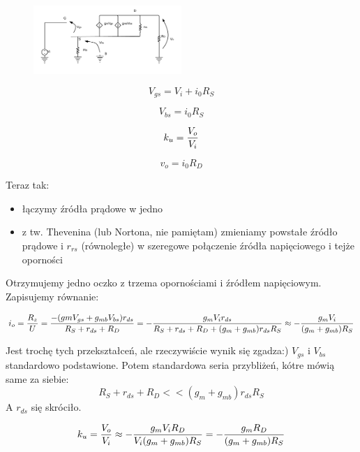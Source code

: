 \documentclass[10pt,a4paper]{article}
\begin{document}
\begin{figure}[H]
\centering
\includegraphics[width=0.5\textwidth]{DS}
\end{figure}

\begin{equation}
V_{gs} = V_i + i_0R_S 
\end{equation}

\begin{equation}
V_{bs} = i_0R_S
\end{equation}

\begin{equation}
k_u = {V_o \over V_i}
\end{equation}

\begin{equation}
v_o = i_0R_D
\end{equation}

Teraz tak:
\begin{itemize}
\item łączymy źródła prądowe w jedno
\item z tw. Thevenina (lub Nortona, nie pamiętam) zmieniamy powstałe źródło prądowe i $r_{rs}$ (równoległe) w szeregowe połączenie źródła napięciowego i tejże oporności
\end{itemize}
Otrzymujemy jedno oczko z trzema opornościami i źródłem napięciowym. Zapisujemy równanie:

\begin{equation}
i_o = {R_z \over U} = { -(gmV_{gs} + g_{mb}V_{bs})r_{ds} \over R_S + r_{ds} + R_D} = -{g_mV_ir_{ds} \over R_S + r_{ds} + R_D + (g_m+g_{mb})r_{ds}R_S} \approx -{g_mV_i \over  (g_m+g_{mb})R_S} 
\end{equation}

Jest trochę tych przekształceń, ale rzeczywiście wynik się zgadza:) $V_{gs}$ i $V_{bs}$ standardowo podstawione. Potem standardowa seria przybliżeń, kótre mówią same za siebie: 
\begin{equation}
 R_S + r_{ds} + R_D << (g_m+g_{mb})r_{ds}R_S
\end{equation}
A $r_{ds}$ się skróciło.

\begin{equation}
k_u = {V_o \over V_i} \approx -{g_mV_iR_D \over  V_i(g_m+g_{mb})R_S} = -{g_mR_D \over  (g_m+g_{mb})R_S}
\end{equation}
\end{document}
